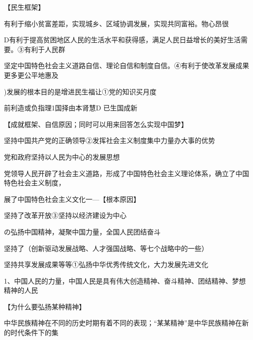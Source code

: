 \documentclass[lang=cn,11pt]{elegantbook}
\newcommand{\daofasym}[1]{{\daofasymbolfont #1}}
\newcommand{\daofasym}[1]{#1}
\begin{document}
【民生框架】\par

有利于缩小贫富差距，实现城乡、区域协调发展，实现共同富裕。物心昂很\par

D有利于提高贫困地区人民的生活水平和获得感，满足人民日益增长的美好生活需要。\daofasym{③}有利于人民群\par

坚定中国特色社会主义道路自信、理论自信和制度自信。\daofasym{④}有利于使改革发展成果更多更公平地惠及\par

)发展的根本目的是增进民生福让\daofasym{①}党的知识买月度\par

前利造或负指理1国择由本肾慧D 已生国成新\par

【成就框架、自信原因；同时可以用来回答怎么实现中国梦】\par

坚持中国共产党的正确领导\daofasym{②}发挥社会主义制度集中力量办大事的优势\par

党和政府坚持以人民为中心的发展思想\par

党领导人民开辟了社会主义道路，形成了中国特色社会主义理论体系，确立了中国特色社会主义制度，\par

展了中国特色社会主义文化一—【根本原因】\par

坚持了改革开放\daofasym{③}坚持以经济建设为中心\par

の弘扬中国精神，凝聚中国力量，全国人民团结奋斗\par

坚持了（创新驱动发展战略、人才强国战略、等七个战略中的一些）\par

坚持共享发展成果等等\daofasym{①}弘扬中华优秀传统文化，大力发展先进文化\par

1、中国人民的力量，中国人民是具有伟大创造精神、奋斗精神、团结精神、梦想精神的人民\par

【为什么要弘扬某种精神】\par

中华民族精神在不同的历史时期有着不同的表现；“某某精神”是中华民族精神在新的时代条件下的集\par
\end{document}
